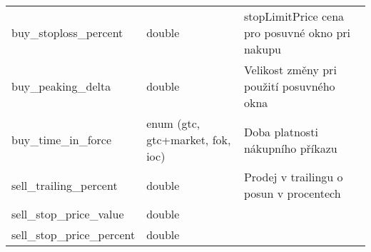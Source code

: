 \begin{center}
\begin{longtable}[t]{|l|C{4cm}|p{4cm}|}
        buy\_stoploss\_percent               & double                                                                                                                                                                                                               & stopLimitPrice cena pro posuvné okno pri nakupu                                                                                   \\
        buy\_peaking\_delta                  & double                                                                                                                                                                                                               & Velikost změny pri použití posuvného okna                                                                                         \\
        buy\_time\_in\_force                 & enum (gtc, gtc+market, fok, ioc)                                                                                                                                                                                     & Doba platnosti nákupního příkazu                                                                                                  \\
        sell\_trailing\_percent              & double                                                                                                                                                                                                               & Prodej v trailingu o posun v procentech                                                                                           \\
        sell\_stop\_price\_value             & double                                                                                                                                                                                                               &                                                                                                                                   \\
        sell\_stop\_price\_percent           & double                                                                                                                                                                                                               &                                                                                                                                   \\

\end{longtable}
\end{center}
